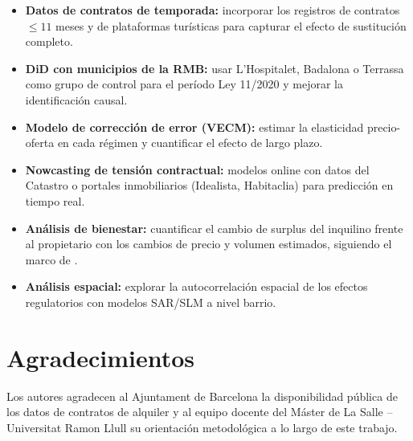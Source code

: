 \documentclass[12pt,a4paper]{article}
\begin{document}
\begin{itemize}[leftmargin=*, itemsep=4pt]
  \item \textbf{Datos de contratos de temporada:} incorporar los registros de
    contratos $\leq 11$ meses y de plataformas turísticas para capturar el efecto
    de sustitución completo.
  \item \textbf{DiD con municipios de la RMB:} usar L'Hospitalet, Badalona o
    Terrassa como grupo de control para el período Ley 11/2020 y mejorar la
    identificación causal.
  \item \textbf{Modelo de corrección de error (VECM):} estimar la elasticidad
    precio-oferta en cada régimen y cuantificar el efecto de largo plazo.
  \item \textbf{Nowcasting de tensión contractual:} modelos online con datos del
    Catastro o portales inmobiliarios (Idealista, Habitaclia) para predicción en
    tiempo real.
  \item \textbf{Análisis de bienestar:} cuantificar el cambio de surplus del
    inquilino frente al propietario con los cambios de precio y volumen estimados,
    siguiendo el marco de \citet{diamond2019rent}.
  \item \textbf{Análisis espacial:} explorar la autocorrelación espacial de los
    efectos regulatorios con modelos SAR/SLM a nivel barrio.
\end{itemize}

\section*{Agradecimientos}

Los autores agradecen al Ajuntament de Barcelona la disponibilidad pública de los datos
de contratos de alquiler y al equipo docente del Máster de La Salle -- Universitat Ramon
Llull su orientación metodológica a lo largo de este trabajo.
\end{document}
